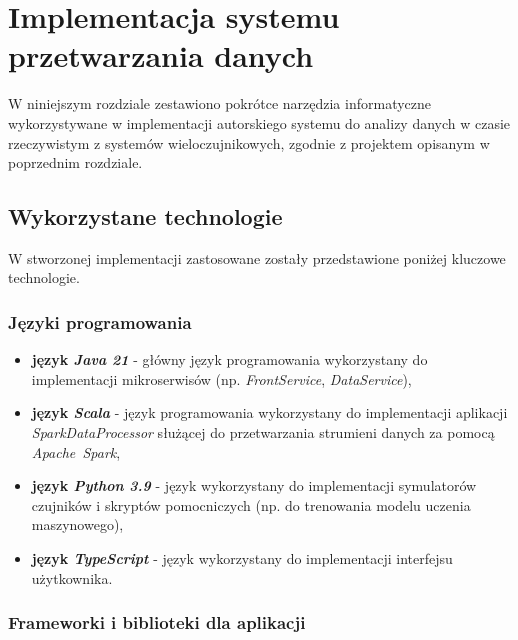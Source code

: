 \section{Implementacja systemu przetwarzania danych}
\label{sec:implementacja_systemu}

W niniejszym rozdziale zestawiono pokrótce narzędzia informatyczne wykorzystywane w implementacji autorskiego systemu do analizy danych w czasie rzeczywistym z systemów wieloczujnikowych,
zgodnie z projektem opisanym w poprzednim rozdziale.

\subsection{Wykorzystane technologie}
\label{subsec:technologie}

W stworzonej implementacji zastosowane zostały przedstawione poniżej kluczowe technologie.

\subsubsection{Języki programowania}
\label{subsubsec:jezyki_programowania}

\begin{itemize}
    \item \textbf{język \textit{Java 21}} - główny język programowania wykorzystany do implementacji mikroserwisów (np. \textit{FrontService}, \textit{DataService}),
    \item \textbf{język \textit{Scala}} - język programowania wykorzystany do implementacji aplikacji \\ \textit{\mbox{SparkDataProcessor}} służącej do przetwarzania strumieni danych za pomocą \mbox{\textit{Apache Spark}},
    \item \textbf{język \textit{Python 3.9}} - język wykorzystany do implementacji symulatorów czujników i skryptów pomocniczych (np. do trenowania modelu uczenia maszynowego),
    \item \textbf{język \textit{TypeScript}} - język wykorzystany do implementacji interfejsu użytkownika.
\end{itemize}

\subsubsection{Frameworki i biblioteki dla aplikacji}
\label{subsubsec:frameworki}

